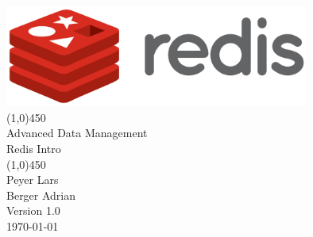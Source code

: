 \begin{titlepage}
	
	\begin{center}
		\includegraphics[width=100mm]{media/titleimage.jpg}\\[10mm]	
		\line(1,0){450}\\[7mm]
		\huge{Advanced Data Management \protect\\[10mm] Redis Intro}\\[2mm]
		\line(1,0){450}\\[2cm]
		\large{Peyer Lars}\\[3mm]
		\large{Berger Adrian}\\[15mm]
		\large{Version 1.0}\\[5mm]
		\today\\[20mm]
		
	\end{center}
\end{titlepage}
\newpage